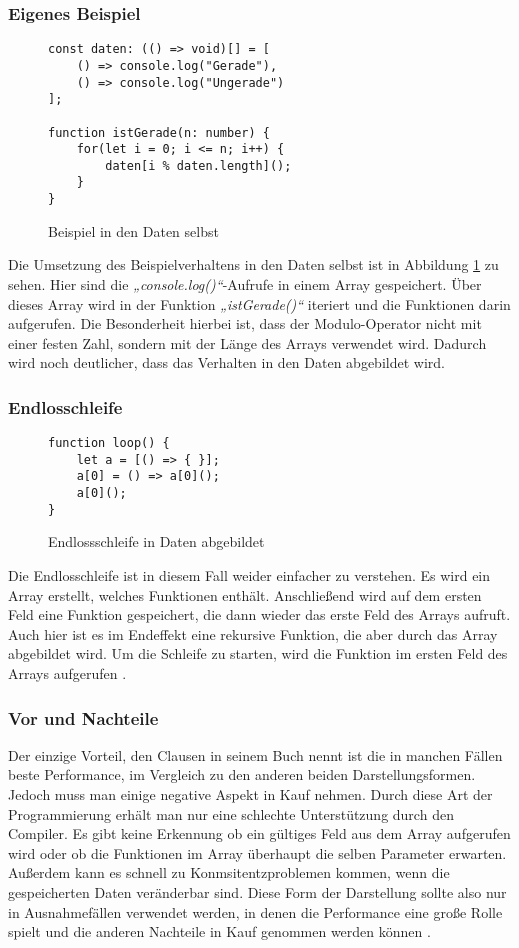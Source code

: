 \subsubsection{Eigenes Beispiel}
\begin{figure}[ht]
    \centering
        \begin{verbatim}
const daten: (() => void)[] = [
    () => console.log("Gerade"),
    () => console.log("Ungerade")
];

function istGerade(n: number) {
    for(let i = 0; i <= n; i++) {
        daten[i % daten.length]();
    }
}
        \end{verbatim}
    \caption{Beispiel in den Daten selbst}
    \label{fig:DatenIstGerade}
\end{figure}
Die Umsetzung des Beispielverhaltens in den Daten selbst ist in Abbildung \ref{fig:DatenIstGerade} zu sehen.
Hier sind die \textit{„console.log()“}-Aufrufe in einem Array gespeichert. 
Über dieses Array wird in der Funktion \textit{„istGerade()“} iteriert und die Funktionen darin aufgerufen.
Die Besonderheit hierbei ist, dass der Modulo-Operator nicht mit einer festen Zahl, sondern mit der Länge des Arrays verwendet wird.
Dadurch wird noch deutlicher, dass das Verhalten in den Daten abgebildet wird.
\subsubsection{Endlosschleife}
\begin{figure}[ht]
    \centering
        \begin{verbatim}
function loop() {
    let a = [() => { }];
    a[0] = () => a[0]();
    a[0]();
}
        \end{verbatim}
    \caption{Endlossschleife in Daten abgebildet \citep[S. 319]{fiveLines.2023}}
    \label{fig:DatenEndloss}
\end{figure}
Die Endlosschleife ist in diesem Fall weider einfacher zu verstehen.
Es wird ein Array erstellt, welches Funktionen enthält.
Anschließend wird auf dem ersten Feld eine Funktion gespeichert, die dann wieder das erste Feld des Arrays aufruft.
Auch hier ist es im Endeffekt eine rekursive Funktion, die aber durch das Array abgebildet wird.
Um die Schleife zu starten, wird die Funktion im ersten Feld des Arrays aufgerufen \citep[S. 319]{fiveLines.2023}.
\newpage
\subsubsection{Vor und Nachteile}
Der einzige Vorteil, den Clausen in seinem Buch nennt ist die in manchen Fällen beste Performance, im Vergleich zu den anderen beiden Darstellungsformen.
Jedoch muss man einige negative Aspekt in Kauf nehmen. Durch diese Art der Programmierung erhält man nur eine schlechte Unterstützung durch den Compiler.
Es gibt keine Erkennung ob ein gültiges Feld aus dem Array aufgerufen wird oder ob die Funktionen im Array überhaupt die selben Parameter erwarten.
Außerdem kann es schnell zu Konmsitentzproblemen kommen, wenn die gespeicherten Daten veränderbar sind.
Diese Form der Darstellung sollte also nur in Ausnahmefällen verwendet werden, in denen die Performance eine große Rolle spielt und die anderen Nachteile in Kauf genommen werden können \citep[S. 319 f.]{fiveLines.2023}.